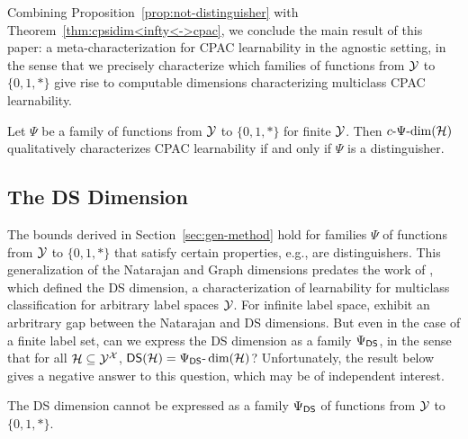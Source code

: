 \documentclass[11pt]{article}
\begin{document}
Combining Proposition~\ref{prop:not-distinguisher} with Theorem~\ref{thm:cpsidim<infty<->cpac}, we conclude the main result of this paper: a meta-characterization for CPAC learnability in the agnostic setting, in the sense that we precisely characterize which families of functions from  $\mathcal{Y}$ to $\{0,1,*\}$ give rise to computable dimensions characterizing multiclass CPAC learnability.

\begin{theorem}
    \label{thm:meta-characterization}
    Let $\Psi$ be a family of functions from $\mathcal{Y}$ to $\{0,1,*\}$ for finite $\mathcal{Y}$.
    Then $c\text{-}\Psi\text{-}\mathrm{dim}(\mathcal{H})$ qualitatively characterizes CPAC learnability if and only if $\Psi$ is a distinguisher.
\end{theorem}

\subsection{The DS Dimension}

The bounds derived in Section~\ref{sec:gen-method} hold for families $\Psi$ of functions from $\mathcal{Y}$ to $\{0,1,*\}$ that satisfy certain properties, e.g., are distinguishers.
This generalization of the Natarajan and Graph dimensions predates the work of \cite{daniely2014optimal}, which defined the DS dimension, a characterization of learnability for multiclass classification for arbitrary label spaces $\mathcal{Y}$.
For infinite label space, \cite{brukhim2022characterization} exhibit an arbritrary gap between the Natarajan and DS dimensions.
But even in the case of a finite label set, can we express the DS dimension as a family $\Psi_{\mathsf{DS}}$, in the sense that for all $\mathcal{H}\subseteq\mathcal{Y}^{\mathcal{X}}$, $\mathsf{DS}(\mathcal{H})=\Psi_{\mathsf{DS}}\text{-}\dim(\mathcal{H})$?
Unfortunately, the result below gives a negative answer to this question, which may be of independent interest.

\begin{lemma}
    The DS dimension cannot be expressed as a family $\Psi_{\mathsf{DS}}$ of functions from $\mathcal{Y}$ to $\{0,1,*\}$.
\end{lemma}
\end{document}
